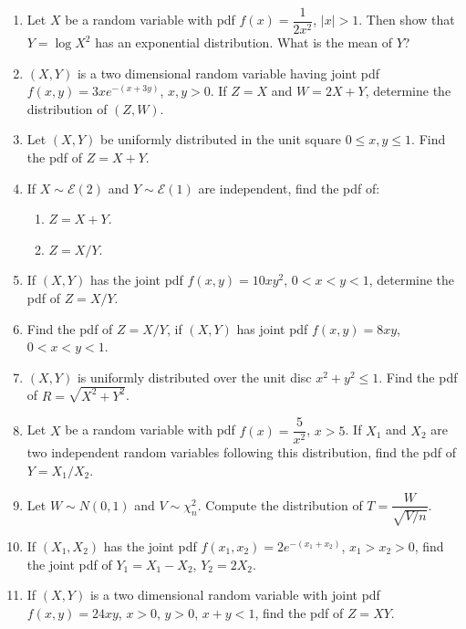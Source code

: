 \documentclass[svgnames]{amsart}
\begin{document}
\begin{enumerate}[leftmargin=*, itemsep=0.3em]
\item Let $X$ be a random variable with pdf $f(x) = \dfrac 1 {2x^2}$, $|x| > 1$. Then show that $Y = \log X^2$ has an exponential distribution. What is the mean of $Y$?

\item $(X, Y)$ is a two dimensional random variable having joint pdf $f(x, y) = 3xe^{-(x+3y)}$, $x,y > 0$. If $Z = X$ and $W = 2X + Y$, determine the distribution of $(Z, W)$.

\item Let $(X, Y)$ be uniformly distributed in the unit square $0 \le x, y \le 1$. Find the pdf of $Z = X + Y$.

\item If $X \sim \mathcal E(2)$ and $Y \sim \mathcal E(1)$ are independent, find the pdf of:
\begin{enumerate}
	\item $Z = X + Y$.
	\item $Z = X/Y$.
\end{enumerate}

\item If $(X, Y)$ has the joint pdf $f(x, y) = 10xy^2$, $0 < x < y < 1$, determine the pdf of $Z = X/Y$.

\item Find the pdf of $Z = X/Y$, if $(X, Y)$ has joint pdf $f(x, y) = 8xy$, $0 < x < y < 1$.

\item $(X, Y)$ is uniformly distributed over the unit disc $x^2 + y^2 \le 1$. Find the pdf of $R = \sqrt{X^2 + Y^2}$.

\item Let $X$ be a random variable with pdf $f(x) = \dfrac 5 {x^2}$, $x > 5$. If $X_1$ and $X_2$ are two independent random variables following this distribution, find the pdf of $Y = X_1/X_2$.

\item Let $W \sim N(0, 1)$ and $V \sim \chi^2_n$. Compute the distribution of $T = \dfrac{W}{\sqrt{V/n}}$.

\item If $(X_1, X_2)$ has the joint pdf $f(x_1, x_2) = 2e^{-(x_1 + x_2)}$, $x_1 > x_2 > 0$, find the joint pdf of $Y_1 = X_1 - X_2$, $Y_2 = 2X_2$.

\item If $(X, Y)$ is a two dimensional random variable with joint pdf $f(x, y) = 24 xy$, $x > 0$, $y > 0$, $x + y < 1$, find the pdf of $Z = XY$.

\end{enumerate}
\end{document}
